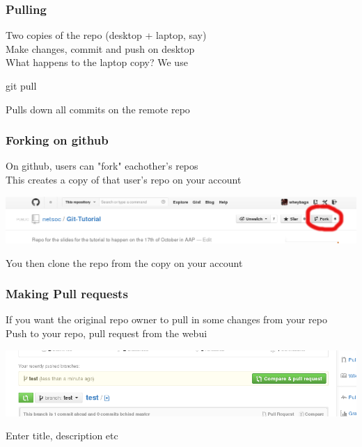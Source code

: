 \documentclass[xcolor=dvipsnames]{beamer}
\begin{document}
\begin{frame}
    \frametitle{Pulling}

    Two copies of the repo (desktop + laptop, say)\\
    Make changes, commit and push on desktop\\\vbox{}
    What happens to the laptop copy? We use
    \begin{block}{}
        git pull
    \end{block}
    Pulls down all commits on the remote repo
\end{frame}

\begin{frame}
    \frametitle{Forking on github}

    On github, users can "fork" eachother's repos\\
    This creates a copy of that user's repo on your account\\

    \begin{center}
        \includegraphics[scale=0.3]{gh-fork.png}
    \end{center}

    You then clone the repo from the copy on your account
\end{frame}

\begin{frame}
    \frametitle{Making Pull requests}

    If you want the original repo owner to pull in some changes from your repo\\
    Push to your repo, pull request from the webui

    \begin{center}
        \includegraphics[scale=0.4]{gh-pullrequest.png}
    \end{center}

    Enter title, description etc
\end{frame}
\end{document}

